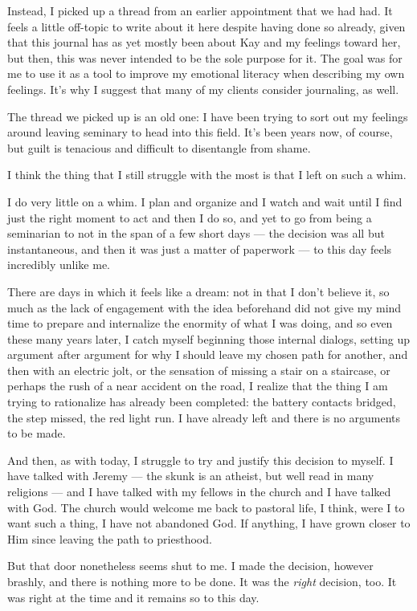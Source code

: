 Instead, I picked up a thread from an earlier appointment that we had had. It feels a little off-topic to write about it here despite having done so already, given that this journal has as yet mostly been about Kay and my feelings toward her, but then, this was never intended to be the sole purpose for it. The goal was for me to use it as a tool to improve my emotional literacy when describing my own feelings. It's why I suggest that many of my clients consider journaling, as well.

The thread we picked up is an old one: I have been trying to sort out my feelings around leaving seminary to head into this field. It's been years now, of course, but guilt is tenacious and difficult to disentangle from shame.

I think the thing that I still struggle with the most is that I left on such a whim.

I do very little on a whim. I plan and organize and I watch and wait until I find just the right moment to act and then I do so, and yet to go from being a seminarian to not in the span of a few short days --- the decision was all but instantaneous, and then it was just a matter of paperwork --- to this day feels incredibly unlike me.

There are days in which it feels like a dream: not in that I don't believe it, so much as the lack of engagement with the idea beforehand did not give my mind time to prepare and internalize the enormity of what I was doing, and so even these many years later, I catch myself beginning those internal dialogs, setting up argument after argument for why I should leave my chosen path for another, and then with an electric jolt, or the sensation of missing a stair on a staircase, or perhaps the rush of a near accident on the road, I realize that the thing I am trying to rationalize has already been completed: the battery contacts bridged, the step missed, the red light run. I have already left and there is no arguments to be made.

And then, as with today, I struggle to try and justify this decision to myself. I have talked with Jeremy --- the skunk is an atheist, but well read in many religions --- and I have talked with my fellows in the church and I have talked with God. The church would welcome me back to pastoral life, I think, were I to want such a thing, I have not abandoned God. If anything, I have grown closer to Him since leaving the path to priesthood.

But that door nonetheless seems shut to me. I made the decision, however brashly, and there is nothing more to be done. It was the \emph{right} decision, too. It was right at the time and it remains so to this day.


